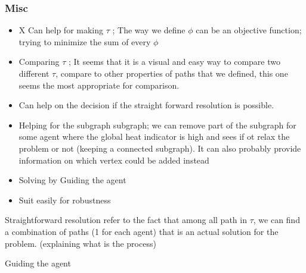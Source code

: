 \subsubsection{Misc}



\begin{itemize}
  \item X Can help for making \(\tau\) ; The way we define \(\phi\) can be an objective function; trying to minimize the sum of every \(\phi\) 
  \item Comparing \(\tau\) ; It seems that it is a visual and easy way to compare two different \(\tau\), compare to other properties of paths that we defined, this one seems the most appropriate for comparison.
  \item Can help on the decision if the straight forward resolution is possible.
  \item Helping for the subgraph subgraph; we can remove part of the subgraph for some agent where the global heat indicator is high and sees if ot relax the problem or not (keeping a connected subgraph). It can also probably provide information on which vertex could be added instead
  \item Solving by Guiding the agent
  \item Suit easily for robustness
\end{itemize}



Straightforward resolution refer to the fact that among all path in \(\tau\), we can find a combination of paths (1 for each agent) that is an actual solution for the problem. (explaining what is the process)


Guiding the agent

